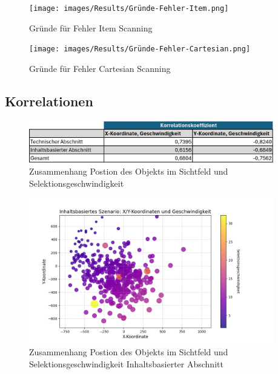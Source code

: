 \begin{figure}[tbh]
 \centering
\texttt{[image: images/Results/Gründe-Fehler-Item.png]}
 \caption{Gründe für Fehler Item Scanning}
 \label{fig:gründeFehlerItem}
\end{figure}

\begin{figure}[tbh]
 \centering
\texttt{[image: images/Results/Gründe-Fehler-Cartesian.png]}
 \caption{Gründe für Fehler Cartesian Scanning}
 \label{fig:gründeFehlerCartesian}
\end{figure}


\subsection{Korrelationen}

\begin{figure}[tbh]
    \centering
   \includegraphics[width=0.95\textwidth]{images/Results/Korrelation-Position-Geschwindigkeit-Table.png}
    \caption{Zusammenhang Postion des Objekts im Sichtfeld und Selektionsgeschwindigkeit}
    \label{fig:tableKorrPosGeschwindigkeit}
   \end{figure}

   \begin{figure}[tbh]
    \centering
   \includegraphics[width=0.95\textwidth]{images/Results/bubbleplot-inhalt.png}
    \caption{Zusammenhang Postion des Objekts im Sichtfeld und Selektionsgeschwindigkeit Inhaltsbasierter Abschnitt}
    \label{fig:bubbleKorrPosGeschwindigkeitInhalt}
   \end{figure}

